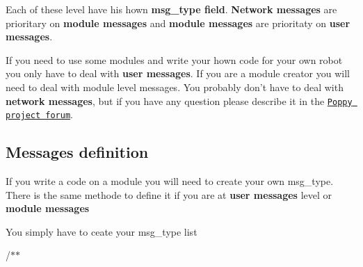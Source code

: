 Each of these level have his hown {\bfseries msg\-\_\-type field}. {\bfseries Network messages} are prioritary on {\bfseries module messages} and {\bfseries module messages} are prioritaty on {\bfseries user messages}.

If you need to use some modules and write your hown code for your own robot you only have to deal with {\bfseries user messages}. If you are a module creator you will need to deal with module level messages. You probably don't have to deal with {\bfseries network messages}, but if you have any question please describe it in the \href{https://forum.poppy-project.org}{\tt Poppy project forum}.

\subsection*{Messages definition }

If you write a code on a module you will need to create your own msg\-\_\-type. There is the same methode to define it if you are at {\bfseries user messages} level or {\bfseries module messages}

You simply have to ceate your msg\-\_\-type list

/$\ast$$\ast$
\begin{DoxyItemize}
\item 
\end{DoxyItemize}